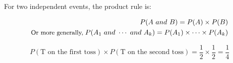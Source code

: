 \documentclass[notes,11pt, aspectratio=169]{beamer}
\begin{document}

\begin{frame}
\frametitle{}

For two independent events, the product rule is:
\begin{tcolorbox}[colback=textboxgreen, colframe=textboxred]
\begin{align*}
P(A~and~B) = P(A) \times P(B)  \\
\small{\text{Or more generally,} \;  P(A_1~and~\cdots~and~A_k) = P(A_1) \times \cdots \times P(A_k)}
\end{align*}
\end{tcolorbox}

\pause


\pause
\begin{tcolorbox}[colback=textboxred!75, colframe = white]
\color{white}
\[ P(\text{T on the first toss}) \times  P(\text{T on the second toss}) = \frac{1}{2} \times \frac{1}{2} = \frac{1}{4} \]
\end{tcolorbox}

\end{frame}

\end{document}
